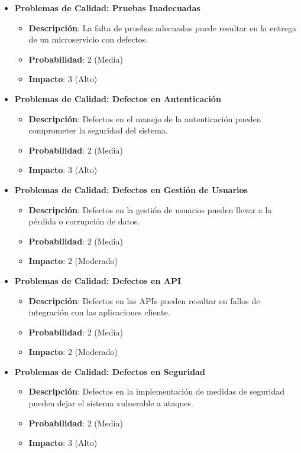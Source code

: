 \documentclass{article}
\begin{document}
\begin{itemize}
    \item \textbf{Problemas de Calidad: Pruebas Inadecuadas}
          \begin{itemize}
              \item \textbf{Descripción}: La falta de pruebas adecuadas puede resultar en la entrega de un microservicio con defectos.
              \item \textbf{Probabilidad}: 2 (Media)
              \item \textbf{Impacto}: 3 (Alto)
          \end{itemize}

    \item \textbf{Problemas de Calidad: Defectos en Autenticación}
          \begin{itemize}
              \item \textbf{Descripción}: Defectos en el manejo de la autenticación pueden comprometer la seguridad del sistema.
              \item \textbf{Probabilidad}: 2 (Media)
              \item \textbf{Impacto}: 3 (Alto)
          \end{itemize}

    \item \textbf{Problemas de Calidad: Defectos en Gestión de Usuarios}
          \begin{itemize}
              \item \textbf{Descripción}: Defectos en la gestión de usuarios pueden llevar a la pérdida o corrupción de datos.
              \item \textbf{Probabilidad}: 2 (Media)
              \item \textbf{Impacto}: 2 (Moderado)
          \end{itemize}

    \item \textbf{Problemas de Calidad: Defectos en API}
          \begin{itemize}
              \item \textbf{Descripción}: Defectos en las APIs pueden resultar en fallos de integración con las aplicaciones cliente.
              \item \textbf{Probabilidad}: 2 (Media)
              \item \textbf{Impacto}: 2 (Moderado)
          \end{itemize}

    \item \textbf{Problemas de Calidad: Defectos en Seguridad}
          \begin{itemize}
              \item \textbf{Descripción}: Defectos en la implementación de medidas de seguridad pueden dejar el sistema vulnerable a ataques.
              \item \textbf{Probabilidad}: 2 (Media)
              \item \textbf{Impacto}: 3 (Alto)
          \end{itemize}


\end{itemize}
\end{document}

